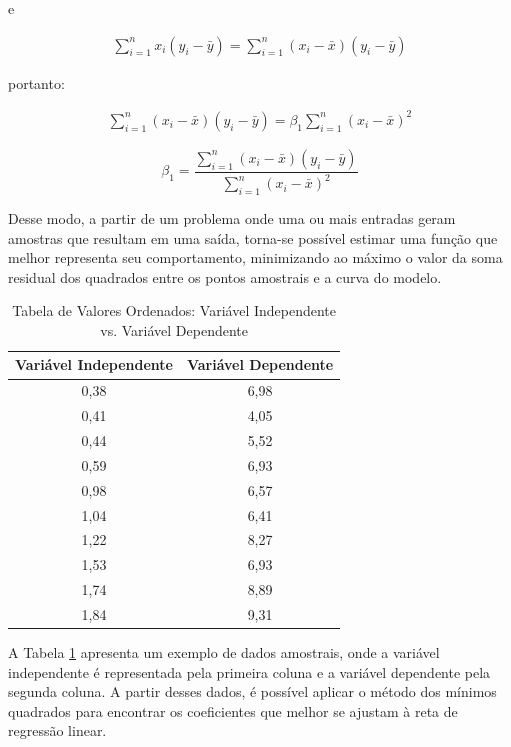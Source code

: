 e

\begin{gather*}
	\sum_{i=1}^n x_i (y_i - \bar{y}) = \sum_{i=1}^n (x_i - \bar{x})(y_i - \bar{y})	
\end{gather*}

portanto:

\begin{gather*}
	\sum_{i=1}^n (x_i - \bar{x})(y_i - \bar{y}) = \beta_1 \sum_{i=1}^n (x_i - \bar{x})^2
\end{gather*}

\begin{equation}
	\beta_1 = \frac{\sum_{i=1}^n (x_i - \bar{x})(y_i - \bar{y})}{\sum_{i=1}^n (x_i - \bar{x})^2}
\end{equation}




Desse modo, a partir de um problema onde uma ou mais entradas geram amostras que resultam em uma saída, torna-se possível estimar uma função que melhor representa seu comportamento, minimizando ao máximo o valor da soma residual dos quadrados entre os pontos amostrais e a curva do modelo. 

\begin{table}[h!]
\centering
\begin{tabular}{|c|c|}
\hline
\textbf{Variável Independente} & \textbf{Variável Dependente} \\
\hline
0,38 & 6,98 \\
0,41 & 4,05 \\
0,44 & 5,52 \\
0,59 & 6,93 \\
0,98 & 6,57 \\
1,04 & 6,41 \\
1,22 & 8,27 \\
1,53 & 6,93 \\
1,74 & 8,89 \\
1,84 & 9,31 \\
\hline
\end{tabular}
\caption{Tabela de Valores Ordenados: Variável Independente vs. Variável Dependente}
\label{tab:valores_exemplo_mqo}
\end{table}

A Tabela \ref{tab:valores_exemplo_mqo} apresenta um exemplo de dados amostrais, onde a variável independente é representada pela primeira coluna e a variável dependente pela segunda coluna. A partir desses dados, é possível aplicar o método dos mínimos quadrados para encontrar os coeficientes que melhor se ajustam à reta de regressão linear.


